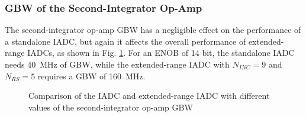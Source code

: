 \subsubsection{GBW of the Second-Integrator Op-Amp}
The second-integrator op-amp GBW has a negligible effect on the performance of a standalone IADC, but again it affects the overall performance of extended-range IADCs, as shown in Fig. \ref{SNR_GBW2}. For an ENOB of 14 bit, the standalone IADC needs 40~MHz of GBW, while the extended-range IADC with $N_{INC}=9$ and $N_{RS}=5$ requires a GBW of 160~MHz.
\begin{figure}[h]
\centering
{}
\qquad
{}
\caption{Comparison of the IADC and extended-range IADC with different values of the second-integrator op-amp GBW}
\label{SNR_GBW2}
\end{figure}


